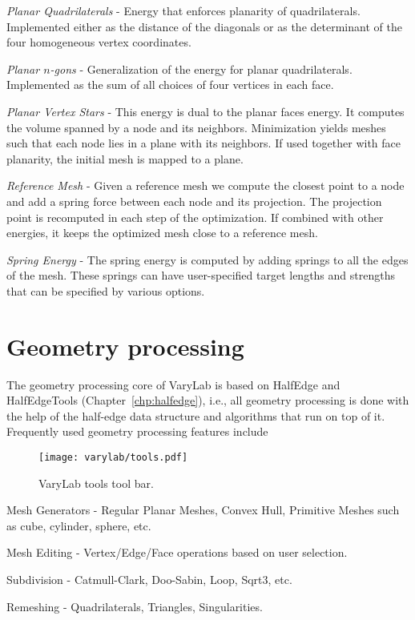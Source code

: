 \documentclass[Thesis.tex]{subfiles}
\begin{document}
\begin{compactitem}[$\bullet$]
\item \emph{Planar Quadrilaterals} - Energy that enforces planarity of quadrilaterals. Implemented either as the distance of the diagonals or as the determinant of the four homogeneous vertex coordinates.
\item \emph{Planar $n$-gons} - Generalization of the energy for planar quadrilaterals. Implemented as the sum of all choices of four vertices in each face.
\item \emph{Planar Vertex Stars} - This energy is dual to the planar faces energy. It computes the volume spanned by a node and its neighbors. Minimization yields meshes such that each node lies in a plane with its neighbors. If used together with face planarity, the initial mesh is mapped to a plane.
\item \emph{Reference Mesh} - Given a reference mesh we compute the closest point to a node and add a spring force between each node and its projection. The projection point is recomputed in each step of the optimization. If combined with other energies, it keeps the optimized mesh close to a reference mesh.
\item \emph{Spring Energy} - The spring energy is computed by adding springs to all the edges of the mesh. These springs can have user-specified target lengths and strengths that can be specified by various options.
\end{compactitem}

\section{Geometry processing}

The geometry processing core of {\sc VaryLab} is based on {\sc HalfEdge} and {\sc HalfEdgeTools} (Chapter~\ref{chp:halfedge}), i.e., all geometry processing is done with the help of the half-edge data structure and algorithms that run on top of it. Frequently used geometry processing features include

\begin{figure}
    \begin{center}
    \texttt{[image: varylab/tools.pdf]}
    \caption{{\sc VaryLab} tools tool bar.}
    \label{fig:varylab_tools_ui}
    \end{center}
\end{figure}

\begin{compactitem}[$\bullet$]
\item Mesh Generators - Regular Planar Meshes, Convex Hull, Primitive Meshes such as cube, cylinder, sphere, etc.
\item Mesh Editing - Vertex/Edge/Face operations based on user selection.
\item Subdivision - Catmull-Clark, Doo-Sabin, Loop, Sqrt3, etc.
\item Remeshing - Quadrilaterals, Triangles, Singularities.
\end{compactitem}
\end{document}
